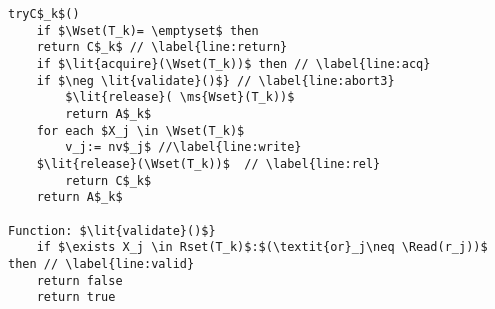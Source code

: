 \begin{algorithm*}[!ht]
\begin{minipage}{0.49\textwidth}
\begin{lstlisting}[frame=none,firstnumber=last,mathescape=true]
tryC$_k$()
    if $\Wset(T_k)= \emptyset$ then
	return C$_k$ // \label{line:return}
    if $\lit{acquire}(\Wset(T_k))$ then	// \label{line:acq}
	if $\neg \lit{validate}()$} // \label{line:abort3}
	    $\lit{release}( \ms{Wset}(T_k))$ 
	    return A$_k$ 
	for each $X_j \in \Wset(T_k)$
	    v_j:= nv$_j$ //\label{line:write}
	$\lit{release}(\Wset(T_k))$  // \label{line:rel}	
	    return C$_k$ 
    return A$_k$ 

Function: $\lit{validate}()$}
    if $\exists X_j \in Rset(T_k)$:$(\textit{or}_j\neq \Read(r_j))$ then // \label{line:valid}
	return false
    return true

\end{lstlisting}
\end{minipage}
\vspace{-1mm}
\end{algorithm*}



